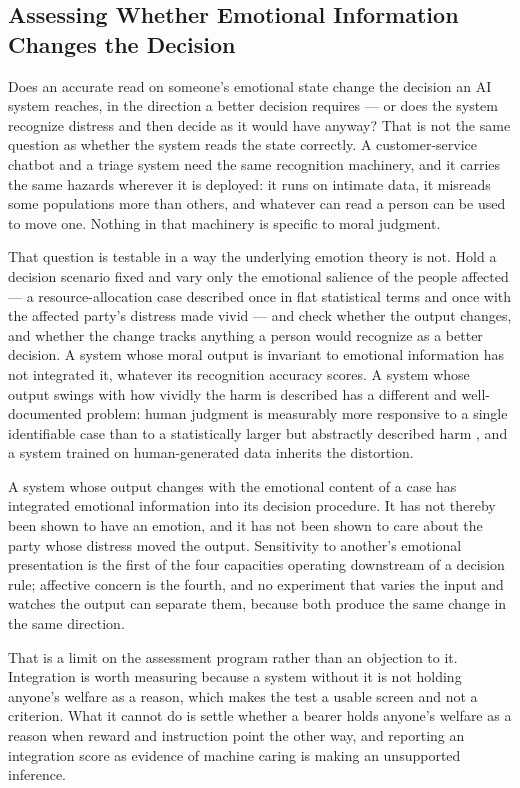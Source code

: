 \subsection{Assessing Whether Emotional Information Changes the Decision}
\label{sec:5.2.2}
Does an accurate read on someone's emotional state change the decision an AI system reaches, in the direction a better decision requires — or does the system recognize distress and then decide as it would have anyway? That is not the same question as whether the system reads the state correctly. A customer-service chatbot and a triage system need the same recognition machinery, and it carries the same hazards wherever it is deployed: it runs on intimate data, it misreads some populations more than others, and whatever can read a person can be used to move one. Nothing in that machinery is specific to moral judgment.

That question is testable in a way the underlying emotion theory is not. Hold a decision scenario fixed and vary only the emotional salience of the people affected — a resource-allocation case described once in flat statistical terms and once with the affected party's distress made vivid — and check whether the output changes, and whether the change tracks anything a person would recognize as a better decision. A system whose moral output is invariant to emotional information has not integrated it, whatever its recognition accuracy scores. A system whose output swings with how vividly the harm is described has a different and well-documented problem: human judgment is measurably more responsive to a single identifiable case than to a statistically larger but abstractly described harm \autocite{kogut2005identified}, and a system trained on human-generated data inherits the distortion.

A system whose output changes with the emotional content of a case has integrated emotional information into its decision procedure. It has not thereby been shown to have an emotion, and it has not been shown to care about the party whose distress moved the output. Sensitivity to another's emotional presentation is the first of the four capacities operating downstream of a decision rule; affective concern is the fourth, and no experiment that varies the input and watches the output can separate them, because both produce the same change in the same direction.

That is a limit on the assessment program rather than an objection to it. Integration is worth measuring because a system without it is not holding anyone's welfare as a reason, which makes the test a usable screen and not a criterion. What it cannot do is settle whether a bearer holds anyone's welfare as a reason when reward and instruction point the other way, and reporting an integration score as evidence of machine caring is making an unsupported inference.

